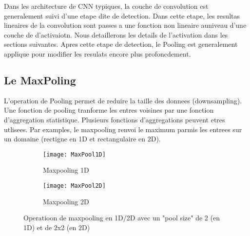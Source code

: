 % 


Dans les architecture de CNN typiques, la couche de convolution est generalement suivi d'une etape dite de detection. Dans cette etape, les resultas lineaires de la convolution sont passes a une fonction non lineaire auniveau d'une couche de d'activaiotn. Nous detaillerons les details de l'activation dans les sections suivantes. Apres cette etape de detection, le Pooling est generalement applique pour modifier les resulats encore plus profoncdement.

\subsection{Le MaxPoling}
\label{subsec:MaxPoling}
L'operation de Pooling permet de reduire la taille des donnees (downsampling). Une fonction de pooling tranforme les entres voisines par une fonction d'aggregation statistique. Plusieurs fonctions d'aggregations peuvent etres utlisees. Par examples, le maxpooling renvoi le maximum parmis les entrees sur un domaine (rectigne en 1D et rectangulaire en 2D). 


\begin{figure}[!h]
\begin{subfigure}{.5\textwidth}
  \centering
  \texttt{[image: MaxPool1D]}  
  \caption[MaxPool1D]{Maxpooling 1D}
\end{subfigure}
\begin{subfigure}{.5\textwidth}
  \centering
  \texttt{[image: MaxPool2D]}  
  \caption[MaxPool2D]{Maxpooling 2D}
\end{subfigure}
\label{fig:MaxPool1D2D}

\centering
\decoRule
\caption[MaxPoling]{Operatioon de maxpooling en 1D/2D avec un "pool size" de 2 (en 1D) et de 2x2 (en 2D)}
\end{figure}


